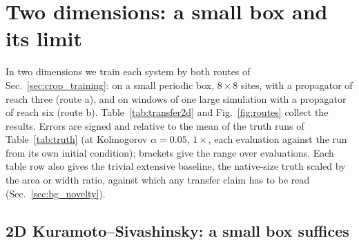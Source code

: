 \section{Two dimensions: a small box and its limit}
\label{sec:results2d}

In two dimensions we train each system by both routes of
Sec.~\ref{sec:crop_training}: on a small periodic box, $8\times8$ sites, with
a propagator of reach three (route a), and on windows of one large
simulation with a propagator of reach six (route b).
Table~\ref{tab:transfer2d} and Fig.~\ref{fig:routes} collect the results.
Errors are signed and relative to the mean of the truth runs of
Table~\ref{tab:truth} (at Kolmogorov $\alpha=0.05$, $1\times$, each
evaluation against the run from its own initial condition); brackets give
the range over evaluations. Each table row also gives the trivial
extensive baseline, the native-size truth scaled by the area or width
ratio, against which any transfer claim has to be read
(Sec.~\ref{sec:bg_novelty}).

\subsection{2D Kuramoto--Sivashinsky: a small box suffices}
\label{sec:ks2d_box}

